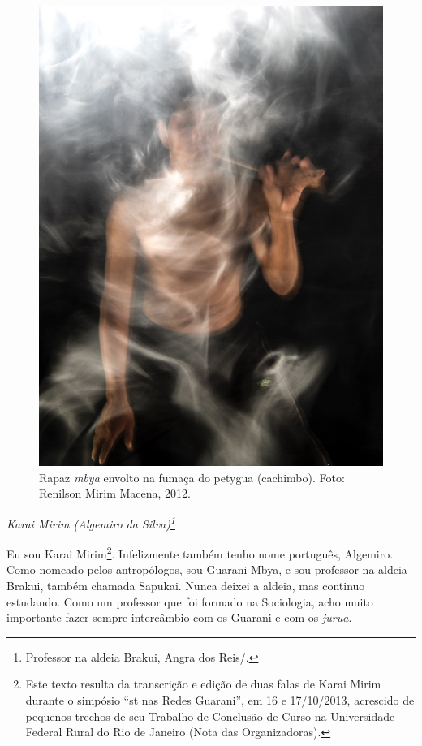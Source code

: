  \begin{figure}
  \centering
 \includegraphics[width=\textwidth]{./img/GUARANIS-img3.jpg}	
  \hfill
  \caption{Rapaz \emph{mbya} envolto na fumaça do petygua (cachimbo). Foto: Renilson
Mirim Macena, 2012.}
\end{figure}




\begin{flushright}
\emph{Karai Mirim (Algemiro da Silva)\footnote{Professor na aldeia Brakui,
Angra dos Reis/.}}
\end{flushright} 

Eu sou Karai Mirim\footnote{Este texto resulta da transcrição e edição
de duas falas de Karai Mirim durante o simpósio ``st nas Redes
Guarani'', em 16 e 17/10/2013, acrescido de pequenos trechos de seu
Trabalho de Conclusão de Curso na Universidade Federal Rural do Rio de
Janeiro (Nota das Organizadoras).}. Infelizmente também tenho nome
português, Algemiro. Como nomeado pelos antropólogos, sou Guarani Mbya,
e sou professor na aldeia Brakui, também chamada Sapukai. Nunca deixei
a aldeia, mas continuo estudando. Como um professor que foi formado na
Sociologia, acho muito importante fazer sempre intercâmbio com os
Guarani e com os \emph{jurua}.


